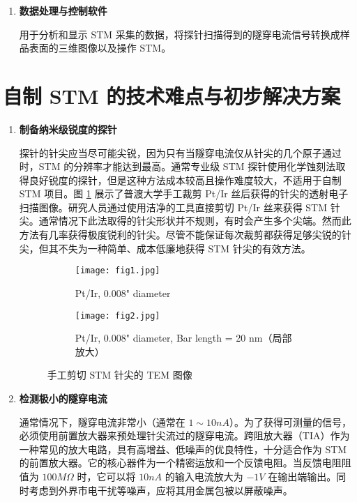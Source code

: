 \documentclass{article}
\begin{document}
\begin{spacing}{1.5}
\begin{enumerate}
		\item \textbf{数据处理与控制软件}\par
		\qquad 用于分析和显示 STM 采集的数据，将探针扫描得到的隧穿电流信号转换成样品表面的三维图像以及操作 STM。
		
	\end{enumerate}
	
	
	
	
	
	
	
	
	
	
	\clearpage
	\section{自制 STM 的技术难点与初步解决方案}
	\setParDis %
	
	\begin{enumerate}
		\item \textbf{制备纳米级锐度的探针}\par
		\qquad 探针的针尖应当尽可能尖锐，因为只有当隧穿电流仅从针尖的几个原子通过时，STM 的分辨率才能达到最高。通常专业级 STM 探针使用化学蚀刻法取得良好锐度的探针，但是这种方法成本较高且操作难度较大，不适用于自制 STM 项目。图 \ref{fig5} 展示了普渡大学手工裁剪 Pt/Ir 丝后获得的针尖的透射电子扫描图像\cite{ref19}。研究人员通过使用洁净的工具直接剪切 Pt/Ir 丝来获得 STM 针尖。通常情况下此法取得的针尖形状并不规则，有时会产生多个尖端。然而此方法有几率获得极度锐利的针尖。尽管不能保证每次裁剪都获得足够尖锐的针尖，但其不失为一种简单、成本低廉地获得 STM 针尖的有效方法。
		
		\begin{figure}[!h]
			\centering
			\begin{subfigure}{0.35\linewidth}
				\centering
				\texttt{[image: fig1.jpg]}
				\caption{Pt/Ir, 0.008" diameter\\\quad}
			\end{subfigure}
			\hskip 1.5cm
			\begin{subfigure}{0.35\linewidth}
				\centering
				\texttt{[image: fig2.jpg]}
				\caption{Pt/Ir, 0.008" diameter, Bar length = 20 nm（局部放大）}
			\end{subfigure}
			\caption{手工剪切 STM 针尖的 TEM 图像}
			\label{fig5}
		\end{figure}
		
		
		
		\item \textbf{检测极小的隧穿电流}\par
		\qquad 通常情况下，隧穿电流非常小（通常在 $1\sim10nA$）。为了获得可测量的信号，必须使用前置放大器来预处理针尖流过的隧穿电流。跨阻放大器（TIA）作为一种常见的放大电路，具有高增益、低噪声的优良特性，十分适合作为 STM 的前置放大器。它的核心器件为一个精密运放和一个反馈电阻。当反馈电阻阻值为 $100M\Omega$ 时，它可以将 $10nA$ 的输入电流放大为 $-1V$ 在输出端输出\cite{ref11,ref12,ref17}。同时考虑到外界市电干扰等噪声，应将其用金属包被以屏蔽噪声。
		

\end{enumerate}
\end{spacing}
\end{document}
